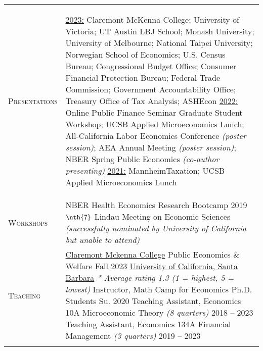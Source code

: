 \documentclass[11pt]{article}
\newcommand{\xspace}{19pt}
\begin{document}
\begin{tabularx}{\textwidth}{@{}Y Z@{}}
	\textsc{Presentations} & 
	\begin{minipage}[t]{1.55\linewidth}	
		\begin{flushleft}
			\uline{2023:} Claremont McKenna College; University of Victoria; UT Austin LBJ School; Monash University; University of Melbourne; National Taipei University; Norwegian School of Economics; U.S. Census Bureau; Congressional Budget Office; Consumer Financial Protection Bureau; Federal Trade Commission; Government Accountability Office; Treasury Office of Tax Analysis; ASHEcon
			\vspace{10pt} \newline
			\uline{2022:} Online Public Finance Seminar Graduate Student Workshop; UCSB Applied Microeconomics Lunch; All-California Labor Economics Conference \textit{(poster session)}; AEA Annual Meeting \textit{(poster session)}; NBER Spring Public Economics \textit{(co-author presenting)}
			\vspace{10pt} \newline
			\uline{2021:} MannheimTaxation; UCSB Applied Microeconomics Lunch
		\end{flushleft}
	\end{minipage}
	\\ \addlinespace[\xspace] 
	
	\textsc{Workshops} & 
	NBER Health Economics Research Bootcamp \hfill 2019%
	\vspace{10pt} \newline
	$\nth{7}$ Lindau Meeting on Economic Sciences \newline \textit{(successfully nominated by University of California but unable to attend)} 
	\\ \addlinespace[\xspace] 
	
	\textsc{Teaching}  & 
	\uline{Claremont Mckenna College}
	\vspace{3pt} \newline
	Public Economics \& Welfare \hfill Fall 2023%
	\vspace{10pt} \newline
	\uline{University of California, Santa Barbara}
	\vspace{3pt} \newline
	\textit{* Average rating 1.3 (1 = highest, 5 = lowest)}
	\vspace{3pt} \newline
	Instructor, Math Camp for Economics Ph.D. Students \hfill Su. 2020%
	\vspace{3pt} \newline
	Teaching Assistant, Economics 10A Microeconomic Theory \textit{(8 quarters)} \hfill 2018 -- 2023%
	\vspace{3pt} \newline
	Teaching Assistant, Economics 134A Financial Management \textit{(3 	quarters)}  \hfill 2019 -- 2023%
	\\ \addlinespace[\xspace] 
	

\end{tabularx}
\end{document}
